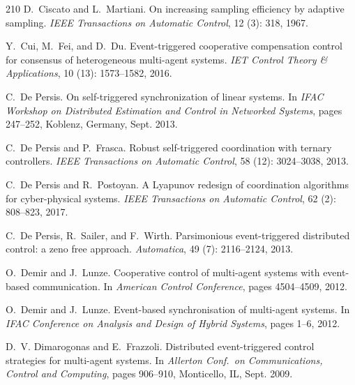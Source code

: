 \documentclass{autart}
\begin{document}
{\begin{thebibliography}{210}
D.~Ciscato and L.~Martiani.
\newblock On increasing sampling efficiency by adaptive sampling.
\newblock \emph{IEEE Transactions on Automatic Control}, 12
  (3): 318, 1967.

Y.~Cui, M.~Fei, and D.~Du.
\newblock Event-triggered cooperative compensation control for consensus of
  heterogeneous multi-agent systems.
\newblock \emph{IET Control Theory \& Applications}, 10 (13):
  1573--1582, 2016.

C.~{De Persis}.
\newblock On self-triggered synchronization of linear systems.
\newblock In \emph{IFAC Workshop on Distributed Estimation and Control in
  Networked Systems}, pages 247--252, Koblenz, Germany, Sept. 2013.

C.~{De Persis} and P.~Frasca.
\newblock Robust self-triggered coordination with ternary controllers.
\newblock \emph{IEEE Transactions on Automatic Control}, 58
  (12): 3024--3038, 2013.

C.~{De Persis} and R.~Postoyan.
\newblock A {L}yapunov redesign of coordination algorithms for cyber-physical
  systems.
\newblock \emph{IEEE Transactions on Automatic Control}, 62
  (2): 808--823, 2017.

C.~{De Persis}, R.~Sailer, and F.~Wirth.
\newblock Parsimonious event-triggered distributed control: a zeno free
  approach.
\newblock \emph{Automatica}, 49 (7): 2116--2124, 2013.

O.~Demir and J.~Lunze.
\newblock Cooperative control of multi-agent systems with event-based
  communication.
\newblock In \emph{{A}merican {C}ontrol {C}onference}, pages 4504--4509,
  2012{}.

O.~Demir and J.~Lunze.
\newblock Event-based synchronisation of multi-agent systems.
\newblock In \emph{IFAC Conference on Analysis and Design of Hybrid Systems},
  pages 1--6, 2012{}.

D.~V. Dimarogonas and E.~Frazzoli.
\newblock Distributed event-triggered control strategies for multi-agent
  systems.
\newblock In \emph{Allerton Conf.\ on Communications, Control and Computing},
  pages 906--910, Monticello, IL, Sept. 2009.


\end{thebibliography}}
\end{document}
